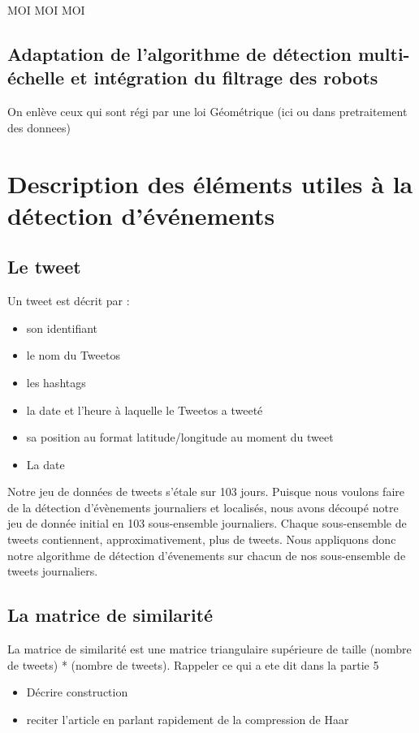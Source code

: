 \documentclass[12pt]{article}
\begin{document}
MOI
\newline 
MOI 
\newline
MOI

\subsection{Adaptation de l'algorithme de d\'etection multi-\'echelle et int\'egration du filtrage des robots}

On enl\`eve ceux qui sont r\'egi par une loi G\'eom\'etrique (ici ou dans pretraitement des donnees)

\newpage

\section{Description des \'el\'ements utiles \`a la d\'etection d'\'ev\'enements}

\subsection{Le tweet}
Un tweet est d\'ecrit par : 

\begin{itemize}
\item son identifiant
\item le nom du Tweetos
\item les hashtags
\item la date et l'heure \`a laquelle le Tweetos a tweet\'e
\item sa position au format latitude/longitude au moment du tweet
\item La date
\end{itemize}

Notre jeu de donn\'ees de tweets s'\'etale sur 103 jours. Puisque nous voulons faire de la d\'etection d'\'ev\`enements journaliers et localis\'es, nous avons d\'ecoup\'e notre jeu de donn\'ee initial en 103 sous-ensemble journaliers. Chaque sous-ensemble de tweets contiennent, approximativement, plus de  tweets.
\newline
Nous appliquons donc notre algorithme de d\'etection d'\'evenements sur chacun de nos sous-ensemble de tweets journaliers.

\subsection{La matrice de similarit\'e}
La matrice de similarit\'e est une matrice triangulaire sup\'erieure de taille (nombre de
tweets) * (nombre de tweets).
\newline
Rappeler ce qui a ete dit dans la partie 5
\begin{itemize}
	\item D\'ecrire construction
	\item reciter l'article en parlant rapidement de la compression de Haar
\end{itemize}
\end{document}
